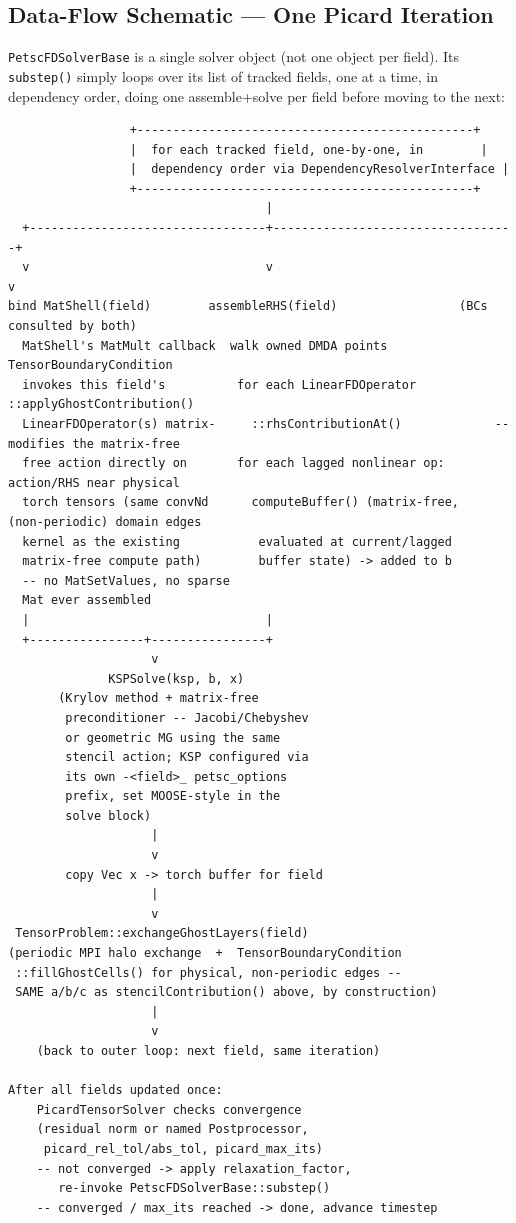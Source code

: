\documentclass[11pt]{article}
\newenvironment{schematic}{%
  \begin{tcolorbox}[breakable, colback=codebg, colframe=gray!40, boxrule=0.4pt, arc=1mm, left=4mm, right=4mm, top=2mm, bottom=2mm]
  \ttfamily\footnotesize
}{%
  \end{tcolorbox}
}
\begin{document}
\subsection{Data-Flow Schematic --- One Picard Iteration}

\texttt{PetscFDSolverBase} is a single solver object (not one object per
field). Its \texttt{substep()} simply loops over its list of tracked fields,
one at a time, in dependency order, doing one assemble+solve per field
before moving to the next:

\begin{schematic}
\begin{verbatim}
                 +-----------------------------------------------+
                 |  for each tracked field, one-by-one, in        |
                 |  dependency order via DependencyResolverInterface |
                 +-----------------------------------------------+
                                    |
  +---------------------------------+----------------------------------+
  v                                 v                                  v
bind MatShell(field)        assembleRHS(field)                 (BCs consulted by both)
  MatShell's MatMult callback  walk owned DMDA points            TensorBoundaryCondition
  invokes this field's          for each LinearFDOperator         ::applyGhostContribution()
  LinearFDOperator(s) matrix-     ::rhsContributionAt()             -- modifies the matrix-free
  free action directly on       for each lagged nonlinear op:       action/RHS near physical
  torch tensors (same convNd      computeBuffer() (matrix-free,     (non-periodic) domain edges
  kernel as the existing           evaluated at current/lagged
  matrix-free compute path)        buffer state) -> added to b
  -- no MatSetValues, no sparse
  Mat ever assembled
  |                                 |
  +----------------+----------------+
                    v
              KSPSolve(ksp, b, x)
       (Krylov method + matrix-free
        preconditioner -- Jacobi/Chebyshev
        or geometric MG using the same
        stencil action; KSP configured via
        its own -<field>_ petsc_options
        prefix, set MOOSE-style in the
        solve block)
                    |
                    v
        copy Vec x -> torch buffer for field
                    |
                    v
 TensorProblem::exchangeGhostLayers(field)
(periodic MPI halo exchange  +  TensorBoundaryCondition
 ::fillGhostCells() for physical, non-periodic edges --
 SAME a/b/c as stencilContribution() above, by construction)
                    |
                    v
    (back to outer loop: next field, same iteration)

After all fields updated once:
    PicardTensorSolver checks convergence
    (residual norm or named Postprocessor,
     picard_rel_tol/abs_tol, picard_max_its)
    -- not converged -> apply relaxation_factor,
       re-invoke PetscFDSolverBase::substep()
    -- converged / max_its reached -> done, advance timestep
\end{verbatim}
\end{schematic}
\end{document}
